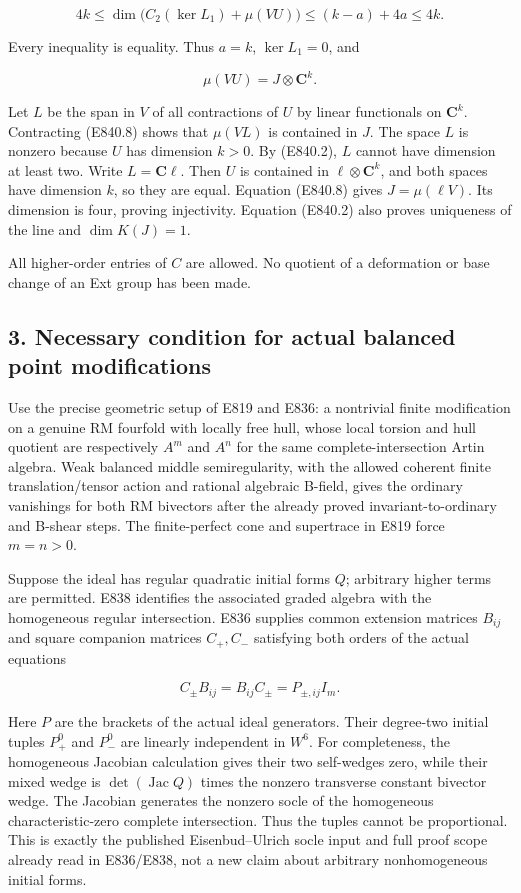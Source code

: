 \[
 4k\le\dim\bigl(C_2(\ker L_1)+\mu(VU)\bigr)
       \le(k-a)+4a\le4k.
 \tag{E840.7}
\]

Every inequality is equality. Thus \(a=k\), \(\ker L_1=0\), and

\[
                     \mu(VU)=J\otimes\mathbf C^k.
 \tag{E840.8}
\]

Let \(L\) be the span in \(V\) of all contractions of \(U\) by linear
functionals on \(\mathbf C^k\). Contracting (E840.8) shows that
\(\mu(VL)\) is contained in \(J\). The space \(L\) is nonzero because
\(U\) has dimension \(k>0\). By (E840.2), \(L\) cannot have dimension at
least two. Write \(L=\mathbf C\ell\). Then \(U\) is contained in
\(\ell\otimes\mathbf C^k\), and both spaces have dimension \(k\), so
they are equal. Equation (E840.8) gives \(J=\mu(\ell V)\). Its dimension
is four, proving injectivity. Equation (E840.2) also proves uniqueness
of the line and \(\dim K(J)=1\).

All higher-order entries of \(C\) are allowed. No quotient of a
deformation or base change of an Ext group has been made.

\subsection{3. Necessary condition for actual balanced point
modifications}\label{necessary-condition-for-actual-balanced-point-modifications}

Use the precise geometric setup of E819 and E836: a nontrivial finite
modification on a genuine RM fourfold with locally free hull, whose
local torsion and hull quotient are respectively \(A^m\) and \(A^n\) for
the same complete-intersection Artin algebra. Weak balanced middle
semiregularity, with the allowed coherent finite translation/tensor
action and rational algebraic B-field, gives the ordinary vanishings for
both RM bivectors after the already proved invariant-to-ordinary and
B-shear steps. The finite-perfect cone and supertrace in E819 force
\(m=n>0\).

Suppose the ideal has regular quadratic initial forms \(Q\); arbitrary
higher terms are permitted. E838 identifies the associated graded
algebra with the homogeneous regular intersection. E836 supplies common
extension matrices \(B_{ij}\) and square companion matrices \(C_+,C_-\)
satisfying both orders of the actual equations

\[
 C_\pm B_{ij}=B_{ij}C_\pm=P_{\pm,ij}I_m.
 \tag{E840.9}
\]

Here \(P\) are the brackets of the actual ideal generators. Their
degree-two initial tuples \(P_+^0\) and \(P_-^0\) are linearly
independent in \(W^6\). For completeness, the homogeneous Jacobian
calculation gives their two self-wedges zero, while their mixed wedge is
\(\det(\operatorname{Jac}Q)\) times the nonzero transverse constant
bivector wedge. The Jacobian generates the nonzero socle of the
homogeneous characteristic-zero complete intersection. Thus the tuples
cannot be proportional. This is exactly the published Eisenbud--Ulrich
socle input and full proof scope already read in E836/E838, not a new
claim about arbitrary nonhomogeneous initial forms.

